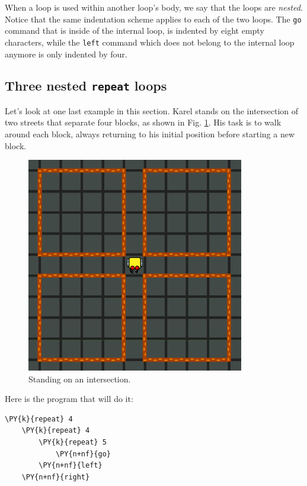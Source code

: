 \noindent
When a loop is used within another loop's body, we say that the loops are {\em nested}.
Notice that the same indentation scheme applies to each of the two loops. The {\tt go}
command that is inside of the internal loop, is indented by eight empty characters, while 
the {\tt left} command which does not belong to the internal loop anymore is only indented 
by four.  

\subsection{Three nested {\tt repeat} loops} \label{subsec:3rep}

Let's look at one last example in this section. Karel stands on the intersection of 
two streets that separate four blocks, as shown in Fig. \ref{fig:repeat-15}. His 
task is to walk around each block, always returning to his initial position before 
starting a new block. 

\newpage
\begin{figure}[!ht]
\begin{center}
\includegraphics[width=9.5cm]{img/repeat-15.png}
\vspace{-0mm}
\caption{Standing on an intersection.}
\label{fig:repeat-15}
\end{center}
\end{figure}
\noindent
Here is the program that will do it:\\

\begin{bbox}
\begin{Verbatim}[commandchars=\\\{\}]
\PY{k}{repeat} 4
    \PY{k}{repeat} 4
        \PY{k}{repeat} 5
            \PY{n+nf}{go}
        \PY{n+nf}{left}
    \PY{n+nf}{right}
\end{Verbatim}
\end{bbox}
\vspace{6mm}

